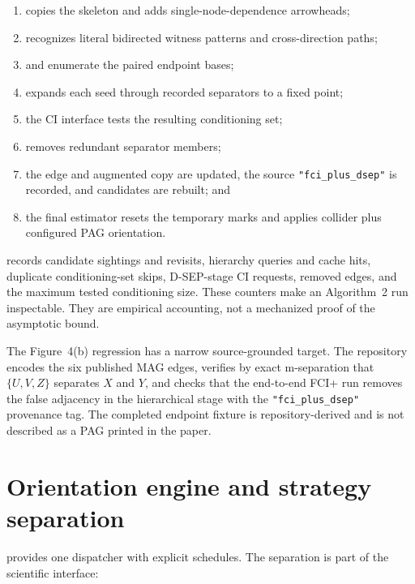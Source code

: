 \documentclass[11pt,a4paper,oneside]{report}
\newcommand{\code}[1]{\texttt{#1}}
\begin{document}
\begin{enumerate}[leftmargin=2em]
  \item {} copies the skeleton and adds
        single-node-dependence arrowheads;
  \item {} recognizes literal bidirected witness
        patterns and cross-direction paths;
  \item {} and
         enumerate the paired endpoint
        bases;
  \item {} expands each seed through recorded separators to a
        fixed point;
  \item the CI interface tests the resulting conditioning set;
  \item {} removes redundant separator members;
  \item the edge and augmented copy are updated, the source
        \code{"fci\_plus\_dsep"} is recorded, and candidates are rebuilt; and
  \item the final estimator resets the temporary marks and applies collider
        plus configured PAG orientation.
\end{enumerate}

 records candidate sightings and revisits, hierarchy
queries and cache hits, duplicate conditioning-set skips, D-SEP-stage CI
requests, removed edges, and the maximum tested conditioning size.  These
counters make an Algorithm~2 run inspectable.  They are empirical accounting,
not a mechanized proof of the asymptotic bound.

The Figure~4(b) regression has a narrow source-grounded target.  The
repository encodes the six published MAG edges, verifies by exact m-separation
that \(\{U,V,Z\}\) separates \(X\) and \(Y\), and checks that the end-to-end
FCI+ run removes the false adjacency in the hierarchical stage with the
\code{"fci\_plus\_dsep"} provenance tag.  The completed endpoint fixture is
repository-derived and is not described as a PAG printed in the paper.

\section{Orientation engine and strategy separation}

 provides one dispatcher with
explicit schedules.  The separation is part of the scientific interface:
\end{document}
